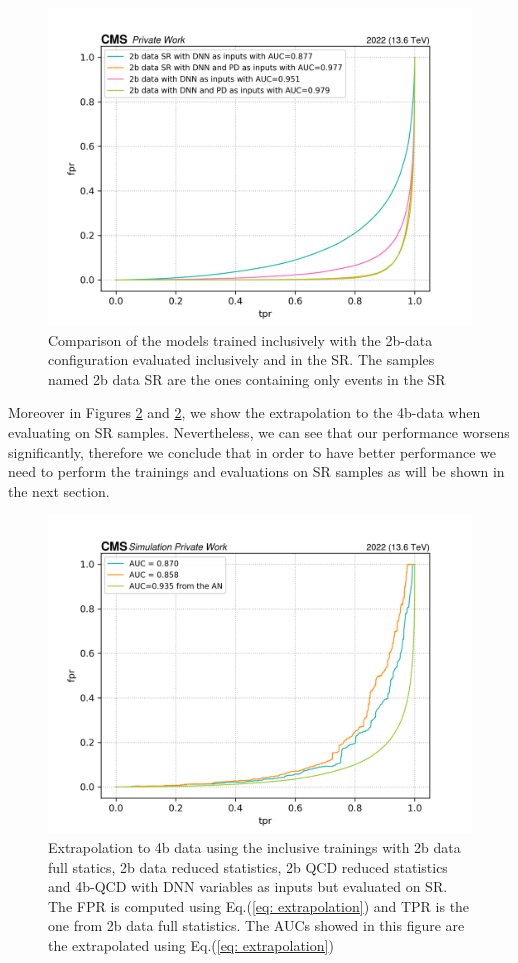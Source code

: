 \begin{figure}[hbt]
    \centering
    \includegraphics[width=0.7\linewidth]{Images/7.S:B/SR stats/2b-data comp.png}
    \caption{Comparison of the models trained inclusively with the 2b-data configuration evaluated inclusively and in the SR. The samples named 2b data SR are the ones containing only events in the SR}
    \label{fig: 2b data comparison ev on SR}
\end{figure}

Moreover in Figures \ref{fig: ev on SR dnn pd} and \ref{fig: ev on SR dnn pd}, we show the extrapolation to the 4b-data when evaluating on SR samples. Nevertheless, we can see that our performance worsens significantly, therefore we conclude that in order to have better performance we need to perform the trainings and evaluations on SR samples as will be shown in the next section.

\begin{figure}[hbt]
    \centering
    \includegraphics[width=0.7\linewidth]{Images/7.S:B/SR stats/4b data extrapol ev on SR dnn.png}
    \caption{Extrapolation to 4b data using the inclusive trainings with 2b data full statics, 2b data reduced statistics, 2b QCD reduced statistics and 4b-QCD with DNN variables as inputs but evaluated on SR. The FPR is computed using Eq.(\ref{eq: extrapolation}) and TPR is the one from 2b data full statistics. The AUCs showed in this figure are the extrapolated using Eq.(\ref{eq: extrapolation})}
    \label{fig: ev on SR dnn pd}
\end{figure}

